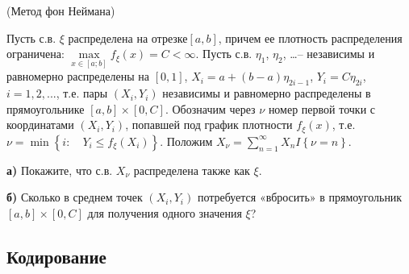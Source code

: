 \begin{problem}
(Метод фон Неймана) 

Пусть с.в. $\xi $ распределена на отрезке$\left[a,b\right]$, причем ее плотность распределения ограничена: $\mathop{\max }\limits_{x\in \left[a;b\right]} f_{\xi } (x)=C<\infty $. Пусть с.в. $\eta _{1} $, $\eta _{2} $, \dots  -- независимы и равномерно распределены на $\left[0,1\right]$, $X_{i} =a+\left(b-a\right)\eta _{2i-1} $, $Y_{i} =C\eta _{2i} $, $i=1,2,...$, т.е. пары $\left(X_{i} ,Y_{i} \right)$ независимы и равномерно распределены в прямоугольнике $\left[a,b\right]\times \left[0,C\right]$. Обозначим через $\nu $ номер первой точки с координатами $\left(X_{i} ,Y_{i} \right)$, попавшей под график плотности $f_{\xi } (x)$, т.е. $\nu =\min \left\{i:\quad Y_{i} \le f_{\xi } (X_{i} )\right\}$. Положим $X_{\nu } =\sum _{n=1}^{\infty }X_{n} I\left\{\nu =n\right\} $.

\textbf{а)} Покажите, что с.в. $X_{\nu } $ распределена также как $\xi $.

\textbf{б)} Сколько в среднем точек $\left(X_{i} ,Y_{i} \right)$ потребуется «вбросить» в прямоугольник $\left[a,b\right]\times \left[0,C\right]$ для получения одного значения $\xi $?
\end{problem}

\subsection{Кодирование}